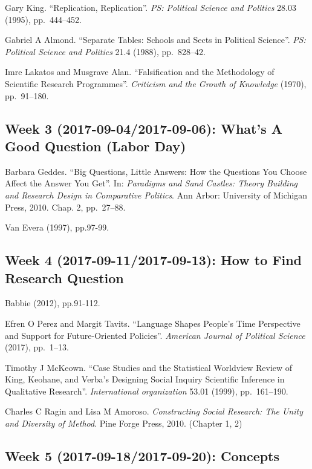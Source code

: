 \documentclass[11pt,]{article}
\theoremstyle{definition}
\theoremstyle{definition}
\theoremstyle{remark}
\begin{document}
Gary King. ``Replication, Replication''.
\emph{PS: Political Science and Politics} 28.03 (1995), pp.~444--452.

Gabriel A Almond. ``Separate Tables: Schools and Sects in Political
Science''. \emph{PS: Political Science and Politics} 21.4 (1988),
pp.~828--42.

Imre Lakatos and Musgrave Alan. ``Falsification and the Methodology of
Scientific Research Programmes''.
\emph{Criticism and the Growth of Knowledge} (1970), pp.~91--180.

\subsection{Week 3 (2017-09-04/2017-09-06): What's A Good Question
(Labor
Day)}\label{week-3-2017-09-042017-09-06-whats-a-good-question-labor-day}

Barbara Geddes. ``Big Questions, Little Answers: How the Questions You
Choose Affect the Answer You Get''. In:
\emph{Paradigms and Sand Castles: Theory Building and Research Design in Comparative Politics}.
Ann Arbor: University of Michigan Press, 2010. Chap. 2, pp.~27--88.

Van Evera (1997), pp.97-99.

\subsection{Week 4 (2017-09-11/2017-09-13): How to Find Research
Question}\label{week-4-2017-09-112017-09-13-how-to-find-research-question}

Babbie (2012), pp.91-112.

Efren O Perez and Margit Tavits. ``Language Shapes People's Time
Perspective and Support for Future-Oriented Policies''.
\emph{American Journal of Political Science} (2017), pp.~1--13.

Timothy J McKeown. ``Case Studies and the Statistical Worldview Review
of King, Keohane, and Verba's Designing Social Inquiry Scientific
Inference in Qualitative Research''. \emph{International organization}
53.01 (1999), pp.~161--190.

Charles C Ragin and Lisa M Amoroso.
\emph{Constructing Social Research: The Unity and Diversity of Method}.
Pine Forge Press, 2010. (Chapter 1, 2)

\subsection{Week 5 (2017-09-18/2017-09-20):
Concepts}\label{week-5-2017-09-182017-09-20-concepts}
\end{document}
